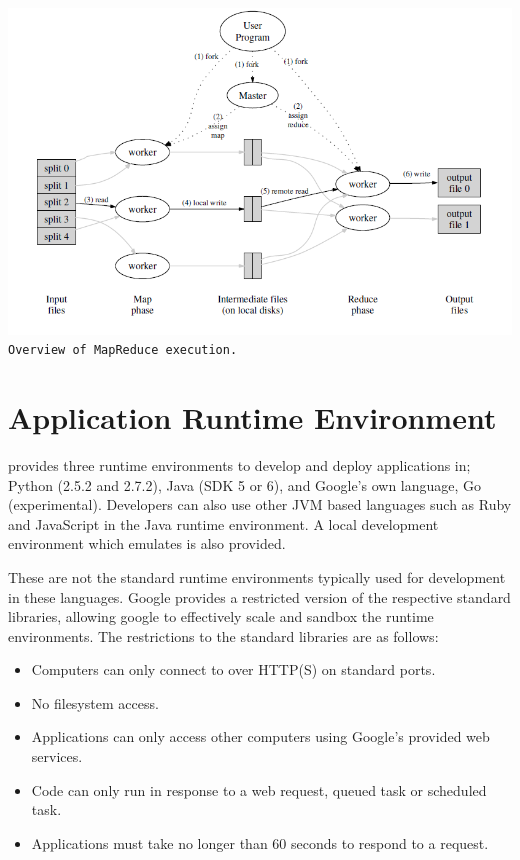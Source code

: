 \begin{center}
\includegraphics[scale=0.4]{figs/MapReduce.png} \\
\texttt{Overview of MapReduce execution.}~\cite{MapReduce}
\end{center}

\section{Application Runtime Environment}
\gae{} provides three runtime environments to develop and deploy applications in; Python (2.5.2 and 2.7.2), Java (SDK 5 or 6), and Google's own language, Go (experimental). Developers can also use other JVM based languages such as Ruby and JavaScript in the Java runtime environment. A local development environment which emulates \gae{} is also provided. 

These are not the standard runtime environments typically used for development in these languages. Google provides a restricted version of the respective standard libraries, allowing google to effectively scale and sandbox the runtime environments. The restrictions to the standard libraries are as follows:
\begin{itemize}
\item Computers can only connect to \gae{} over HTTP(S) on standard ports.
\item No filesystem access.
\item Applications can only access other computers using Google's provided web services.
\item Code can only run in response to a web request, queued task or scheduled task. 
\item Applications must take no longer than 60 seconds to respond to a request.
\end{itemize}

